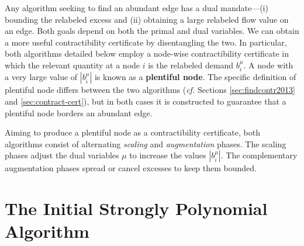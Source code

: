 \documentclass[11pt]{article}
\theoremstyle{definition}
\theoremstyle{definition}
\theoremstyle{definition}
\newcommand{\biu}{b_{i}^{\mu}}
\begin{document}
    Any algorithm seeking to find an abundant edge
    has a dual mandate---(i) bounding the relabeled excess and (ii)
    obtaining a large relabeled flow value on an edge.
    Both goals depend on both the primal
    and dual variables. We can obtain
    a more useful contractibility certificate by disentangling the two. In particular, both algorithms
    detailed below employ a node-wise contractibility certificate in which the
    relevant quantity at a node $i$ is the relabeled demand $\biu$. A node with a very
    large value of $|\biu|$ is known as a \textbf{plentiful node}. The specific definition
    of plentiful node differs between the two algorithms (\emph{cf.} Sections \ref{sec:findcontr2013}
    and \ref{sec:contract-cert}), but in both cases it is constructed to guarantee that a plentiful
    node borders an abundant edge.
    
    Aiming to produce a plentiful node as a contractibility certificate, both algorithms
    consist of alternating \emph{scaling} and \emph{augmentation} phases.
    The scaling phases adjust the dual variables $\mu$ to increase
    the values $|\biu|$. The complementary augmentation phases spread or cancel
    excesses to keep them bounded.

\section{The Initial Strongly Polynomial Algorithm}
\label{sec:2013}
    \label{sec:2013-notation}


\end{document}
